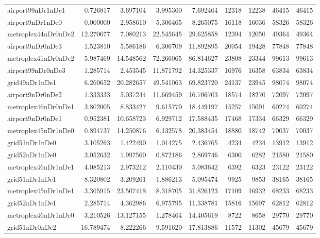 \begin{longtable}{|l|r|r|r|r|r|r|r|r|}
airport99nDr1nDe1 & 0.726817 & 3.697104 & 3.995360 & 7.692464 & 12318 & 12238 & 46415 & 46415 \\
airport9nDr1nDe0 & 0.000000 & 2.958610 & 5.306465 & 8.265075 & 16118 & 16036 & 58326 & 58326 \\
metroplex44nDr0nDe2 & 12.270677 & 7.080213 & 22.545645 & 29.625858 & 12394 & 12050 & 49364 & 49364 \\
airport9nDr0nDe3 & 1.523810 & 5.586186 & 6.306709 & 11.892895 & 20054 & 19428 & 77848 & 77848 \\
metroplex41nDr0nDe2 & 5.987469 & 14.548562 & 72.266065 & 86.814627 & 23808 & 23344 & 99613 & 99613 \\
airport99nDr0nDe3 & 1.285714 & 2.453545 & 11.871792 & 14.325337 & 16976 & 16358 & 63834 & 63834 \\
grid49nDr1nDe1 & 6.260652 & 20.282657 & 49.541063 & 69.823720 & 24137 & 23945 & 98074 & 98074 \\
airport9nDr0nDe2 & 1.333333 & 5.037244 & 11.669459 & 16.706703 & 18574 & 18270 & 72097 & 72097 \\
metroplex46nDr0nDe1 & 3.802005 & 8.833427 & 9.615770 & 18.449197 & 15257 & 15091 & 60274 & 60274 \\
airport9nDr0nDe1 & 0.952381 & 10.658723 & 6.929712 & 17.588435 & 17468 & 17334 & 66329 & 66329 \\
metroplex45nDr1nDe0 & 0.894737 & 14.250876 & 6.132578 & 20.383454 & 18880 & 18742 & 70037 & 70037 \\
grid51nDr1nDe0 & 3.105263 & 1.422490 & 1.014275 & 2.436765 & 4234 & 4234 & 13912 & 13912 \\
grid52nDr1nDe0 & 3.052632 & 1.997560 & 0.872186 & 2.869746 & 6300 & 6282 & 21580 & 21580 \\
metroplex46nDr1nDe1 & 4.085213 & 2.973212 & 2.110430 & 5.083642 & 6392 & 6323 & 23122 & 23122 \\
grid51nDr1nDe1 & 8.320802 & 3.209261 & 1.886213 & 5.095474 & 9925 & 9853 & 38165 & 38165 \\
metroplex45nDr1nDe1 & 3.365915 & 23.507418 & 8.318705 & 31.826123 & 17109 & 16932 & 68233 & 68233 \\
grid52nDr1nDe1 & 2.285714 & 4.362986 & 6.975795 & 11.338781 & 15816 & 15697 & 62812 & 62812 \\
metroplex46nDr1nDe0 & 3.210526 & 13.127155 & 1.278464 & 14.405619 & 8722 & 8658 & 29770 & 29770 \\
grid51nDr0nDe2 & 16.789474 & 8.222266 & 9.591620 & 17.813886 & 11572 & 11302 & 45679 & 45679 \\

\end{longtable}
